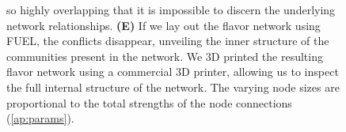 \documentclass[endfloats,nofootinbib,preprint,floatfix,titlepage,superscriptaddress,linenumbers]{revtex4-1} %
\begin{document}
\begin{figure}
{{    so highly overlapping that it is impossible to discern the underlying network relationships.
    {\bf (E)} If we lay out the flavor network using FUEL, the conflicts disappear, 
    unveiling the inner structure of the communities \cite{fortunato2010community}
    present in the network. 
    We 3D printed the resulting flavor network using a commercial 3D printer, allowing us to inspect the full internal structure of the network. %
    The varying node sizes are proportional to the total strengths of the node connections %
    (\ref{ap:params}). 
    }%
    }
    \label{fig:stress}
    \label{fig:3d-print}
\end{figure}
\end{document}
